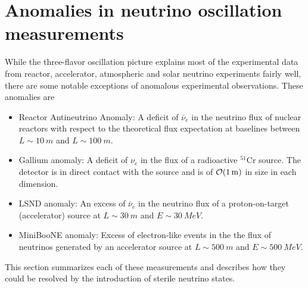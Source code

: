 \section{Anomalies in neutrino oscillation measurements}
While the three-flavor oscillation picture explains most of the experimental data from reactor, accelerator, atmospheric and solar neutrino experiments fairly well, there are some notable exceptions of anomalous experimental observations.
These anomalies are
\begin{itemize}
    \item Reactor Antineutrino Anomaly: A deficit of $\bar{\nu}_e$ in the neutrino flux of nuclear reactors with respect to the theoretical flux expectation at baselines between $L\sim\SI{10}{m}$ and $L\sim\SI{100}{m}$.
    \item Gallium anomaly: A deficit of $\nu_e$ in the flux of a radioactive $^{51}\mathrm{Cr}$ source. The detector is in direct contact with the source and is of $\order{\SI{1}{m}}$ in size in each dimension.
    \item LSND anomaly: An excess of $\bar{\nu}_e$ in the neutrino flux of a proton-on-target (accelerator) source at $L\sim\SI{30}{m}$ and $E\sim\SI{30}{MeV}$.
    \item MiniBooNE anomaly: Excess of electron-like events in the the flux of neutrinos generated by an accelerator source at $L\sim\SI{500}{m}$ and $E\sim\SI{500}{MeV}$.
\end{itemize}
This section summarizes each of these measurements and describes how they could be resolved by the introduction of sterile neutrino states.

